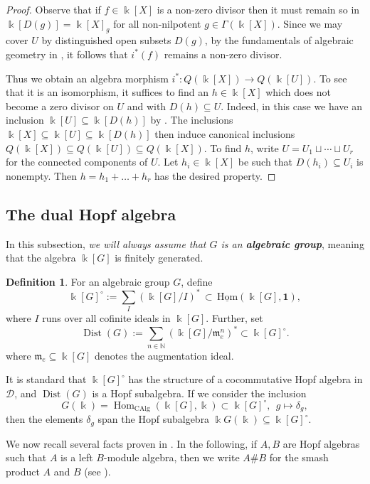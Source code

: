 \documentclass[11pt]{amsart}
\def\Dist{\operatorname{Dist}}
\def\Hom{\operatorname{Hom}}
\newcommand{\uHom}{\underline{\mathrm{Hom}}}
\def\N{\mathbb{N}}
\def\Ds{\mathscr{D}}
\def\m{\mathfrak{m}}
\def\bk{\Bbbk}
\def\sub{\subseteq}
\theoremstyle{definition}
\newtheorem{definition}[thm]{Definition}
\theoremstyle{remark}
\numberwithin{equation}{section}
\newcommand{\unit}{\mathbf{1}}
\newcommand{\CAlg}{\mathrm{CAlg}}
\begin{document}
\begin{proof}
    Observe that if $f\in\Bbbk[X]$ is a non-zero divisor then it must remain so in $\Bbbk[D(g)]=\Bbbk[X]_g$ for all non-nilpotent $g\in\Gamma(\Bbbk[X])$. Since we may cover $U$ by distinguished open subsets $D(g)$, by the fundamentals of algebraic geometry in \cite{C2}, it follows that $i^*(f)$ remains a non-zero divisor.  

    Thus we obtain an algebra morphism $i^*:Q(\Bbbk[X])\to Q(\Bbbk[U])$.  To see that it is an isomorphism, it suffices to find an $h\in \Bbbk[X]$ which does not become a zero divisor on $U$ and with $D(h)\sub U$.  Indeed, in this case we have an inclusion $\Bbbk[U]\sub\Bbbk[D(h)]$ by \cite[Exer.~II.2.16]{H}. The inclusions $\bk[X]\sub \bk[U]\sub \bk[D(h)]$ then induce canonical inclusions $Q(\bk[X])\sub Q(\bk[U])\sub Q(\bk[X])$.  To find $h$, write $U=U_1\sqcup\cdots\sqcup U_r$ for the connected components of $U$.  Let $h_i\in\Bbbk[X]$ be such that $D(h_i)\sub U_i$ is nonempty.  Then $h=h_1+\dots+h_r$ has the desired property. 
\end{proof}


\subsection{The dual Hopf algebra}
In this subsection, {\em we will always assume that $G$ is an {\bf algebraic group}}, meaning that the algebra $\bk[G]$ is finitely generated.

\begin{definition}
    For an algebraic group $G$, define
    \[
    \Bbbk[G]^\circ:=\sum\limits_{I}(\Bbbk[G]/I)^*\,\subset\,\uHom(\bk[G],\unit),
    \]
    where $I$ runs over all cofinite ideals in $\Bbbk[G]$.  Further, set
    \[
    \Dist(G):=\sum\limits_{n\in\N}(\Bbbk[G]/\m_e^n)^*\subset\bk[G]^{\circ}.
    \]
    where $\m_e\sub\Bbbk[G]$ denotes the augmentation ideal.
\end{definition}

It is standard that $\Bbbk[G]^\circ$ has the structure of a cocommutative Hopf algebra in $\Ds$, and $\Dist(G)$ is a Hopf subalgebra.  If we consider the inclusion
\[G(\bk)=\Hom_{\CAlg}(\bk[G],\bk)\subset \bk[G]^{\circ},\;\, g\mapsto \delta_g,\]
then the elements $\delta_{g}$ span the Hopf subalgebra $\Bbbk G(\Bbbk)\sub\Bbbk[G]^\circ$.

 We now recall several facts proven in \cite[\S 3]{CS}.
  In the following, if $A,B$ are Hopf algebras such that $A$ is a left $B$-module algebra, then we write $A\#B$ for the smash product $A$ and $B$ (see \cite[Sec.~4.1]{M}).
\end{document}
